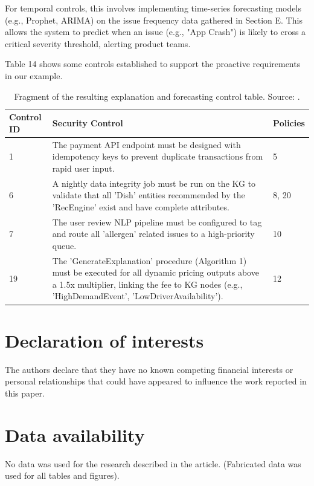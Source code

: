 \documentclass[preprint,10pt]{elsarticle}
\begin{document}
For temporal controls, this involves implementing time-series forecasting models (e.g., Prophet, ARIMA) on the issue frequency data gathered in Section E. This allows the system to predict when an issue (e.g., "App Crash") is likely to cross a critical severity threshold, alerting product teams.

Table 14 shows some controls established to support the proactive requirements in our example.

\begin{table}[h!]
    \caption{Fragment of the resulting explanation and forecasting control table. Source: .}
    \label{tab:14}
    \centering
    \begin{tabular}{lp{8cm}l}
        \toprule
        \textbf{Control ID} & \textbf{Security Control} & \textbf{Policies} \\
        \midrule
        1 & The payment API endpoint must be designed with idempotency keys to prevent duplicate transactions from rapid user input. & 5 \\
        6 & A nightly data integrity job must be run on the KG to validate that all 'Dish' entities recommended by the 'RecEngine' exist and have complete attributes. & 8, 20 \\
        7 & The user review NLP pipeline must be configured to tag and route all 'allergen' related issues to a high-priority queue. & 10 \\
        19 & The 'GenerateExplanation' procedure (Algorithm 1) must be executed for all dynamic pricing outputs above a 1.5x multiplier, linking the fee to KG nodes (e.g., 'HighDemandEvent', 'LowDriverAvailability'). & 12 \\
        \bottomrule
    \end{tabular}
\end{table}

\section*{Declaration of interests}
The authors declare that they have no known competing financial interests or personal relationships that could have appeared to influence the work reported in this paper.

\section*{Data availability}
No data was used for the research described in the article. (Fabricated data was used for all tables and figures).
\end{document}

